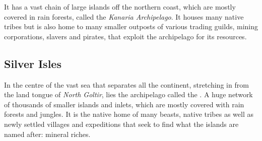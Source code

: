 It has a vast chain of large islands off the northern coast, which are mostly
covered in rain forests, called the \emph{Kanaria Archipelago}. It houses many
native tribes but is also home to many smaller outposts of various trading
guilds, mining corporations, slavers and pirates, that exploit the archipelago
for its resources.

\subsection{Silver Isles}

In the centre of the vast sea that separates all the continent, stretching in
from the land tongue of \emph{North Goltir}, lies the archipelago called the
. A huge network of thousands of smaller islands and
inlets, which are mostly covered with rain forests and jungles. It is the
native home of many beasts, native tribes as well as newly settled villages
and expeditions that seek to find what the islands are named after: mineral
riches.
